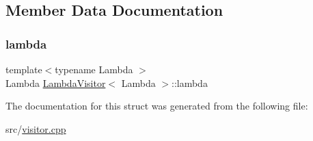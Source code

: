 \subsection{Member Data Documentation}
\mbox{\label{struct_lambda_visitor_a171d971bb3064e3b93c46916f51e4dc2}} 
\subsubsection{\texorpdfstring{lambda}{lambda}}
{\footnotesize\ttfamily template$<$typename Lambda $>$ \\
Lambda \hyperlink{struct_lambda_visitor}{Lambda\+Visitor}$<$ Lambda $>$\+::lambda}



The documentation for this struct was generated from the following file\+:\begin{DoxyCompactItemize}
\item 
src/\hyperlink{visitor_8cpp}{visitor.\+cpp}\end{DoxyCompactItemize}
